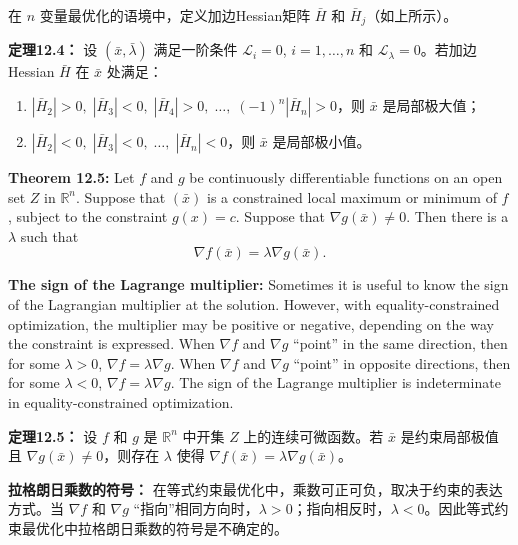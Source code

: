 \begin{translation}
在 $n$ 变量最优化的语境中，定义加边Hessian矩阵 $\bar{H}$ 和 $\bar{H}_j$（如上所示）。

\textbf{定理12.4：} 设 $(\bar{x},\bar{\lambda})$ 满足一阶条件 $\mathcal{L}_i = 0$, $i=1,\ldots,n$ 和 $\mathcal{L}_\lambda = 0$。若加边Hessian $\bar{H}$ 在 $\bar{x}$ 处满足：
\begin{enumerate}
\item $|\bar{H}_2| > 0,\; |\bar{H}_3| < 0,\; |\bar{H}_4| > 0,\; \ldots,\; (-1)^n|\bar{H}_n| > 0$，则 $\bar{x}$ 是局部极大值；
\item $|\bar{H}_2| < 0,\; |\bar{H}_3| < 0,\; \ldots,\; |\bar{H}_n| < 0$，则 $\bar{x}$ 是局部极小值。
\end{enumerate}
\end{translation}

\begin{original}
\textbf{Theorem 12.5:} Let $f$ and $g$ be continuously differentiable functions on an open set $Z$ in $\mathbb{R}^n$. Suppose that $(\bar{x})$ is a constrained local maximum or minimum of $f$, subject to the constraint $g(x) = c$. Suppose that $\nabla g(\bar{x}) \neq 0$. Then there is a $\lambda$ such that
\[
\nabla f(\bar{x}) = \lambda \nabla g(\bar{x}).
\]

\textbf{The sign of the Lagrange multiplier:} Sometimes it is useful to know the sign of the Lagrangian multiplier at the solution. However, with equality-constrained optimization, the multiplier may be positive or negative, depending on the way the constraint is expressed. When $\nabla f$ and $\nabla g$ ``point'' in the same direction, then for some $\lambda > 0$, $\nabla f = \lambda \nabla g$. When $\nabla f$ and $\nabla g$ ``point'' in opposite directions, then for some $\lambda < 0$, $\nabla f = \lambda \nabla g$. The sign of the Lagrange multiplier is indeterminate in equality-constrained optimization.
\end{original}
\begin{translation}
\textbf{定理12.5：} 设 $f$ 和 $g$ 是 $\mathbb{R}^n$ 中开集 $Z$ 上的连续可微函数。若 $\bar{x}$ 是约束局部极值且 $\nabla g(\bar{x}) \neq 0$，则存在 $\lambda$ 使得 $\nabla f(\bar{x}) = \lambda \nabla g(\bar{x})$。

\textbf{拉格朗日乘数的符号：} 在等式约束最优化中，乘数可正可负，取决于约束的表达方式。当 $\nabla f$ 和 $\nabla g$ ``指向''相同方向时，$\lambda > 0$；指向相反时，$\lambda < 0$。因此等式约束最优化中拉格朗日乘数的符号是不确定的。
\end{translation}

